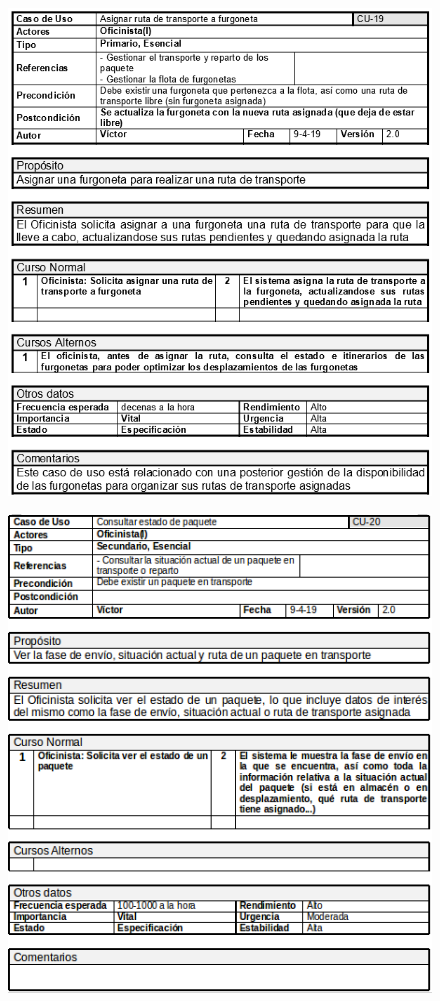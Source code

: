 \begin{figure}[H]
	\centering
	\includegraphics[width=16cm]{19}
\end{figure}
\begin{figure}[H]
	\centering
	\includegraphics[width=16cm]{20}
\end{figure}
